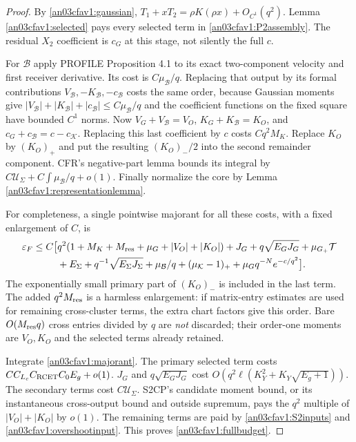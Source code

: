 \documentclass[11pt]{article}
\theoremstyle{remark}\newtheorem{remark}[theorem]{Remark}
\newcommand{\KK}{\mathcal K}
\newcommand{\BB}{\mathcal B}
\newcommand{\Gp}{G_+}
\newcommand{\eps}{\varepsilon}
\begin{document}
\begin{proof}
By \eqref{an03cfav1:gaussian},
$T_1+xT_2=\rho K(\rho x)+O_{C^1}(q^2)$.
Lemma \ref{an03cfav1:selected} pays every selected term
in \eqref{an03cfav1:P2assembly}.
The residual $X_2$ coefficient is $c_G$ at this stage,
not silently the full $c$.

For $\BB$ apply PROFILE Proposition 4.1 to its exact
two-component velocity and first receiver derivative.
Its cost is $C\mu_{\BB}/q$. Replacing that output by its
formal contributions $V_{\BB},-K_{\BB},-c_{\BB}$ costs
the same order, because Gaussian moments give
$|V_{\BB}|+|K_{\BB}|+|c_{\BB}|\le C\mu_{\BB}/q$
and the coefficient functions on the fixed square have
bounded $C^1$ norms. Now $V_G+V_{\BB}=V_O$,
$K_G+K_{\BB}=K_O$, and
$c_G+c_{\BB}=c-c_{\KK}$. Replacing this last coefficient
by $c$ costs $Cq^2M_K$. Replace $K_O$ by $(K_O)_+$ and
put the resulting $(K_O)_-/2$ into the second remainder
component. CFR's negative-part lemma bounds its integral
by $C\mathcal U_\Sigma+C\int\mu_{\BB}/q+o(1)$.
Finally normalize the core by Lemma
\ref{an03cfav1:representationlemma}.

For completeness, a single pointwise majorant for all these
costs, with a fixed enlargement of $C$, is
\begin{align}
 \eps_F\le C\big[&
 q^2(1+M_K+M_{\rm res}+\mu_G+|V_O|+|K_O|)
 +J_G+q\sqrt{E_GJ_G}
 +\mu_{\Gp}\mathcal T\nonumber\\
 &+E_\Sigma+q^{-1}\sqrt{E_\Sigma J_\Sigma}
 +\mu_{\BB}/q+(\mu_{\KK}-1)_+
 +\mu_G q^{-N}e^{-c/q^2}\big].
 \label{an03cfav1:majorant}
\end{align}
The exponentially small primary part of $(K_O)_-$ is
included in the last term. The added $q^2M_{\rm res}$ is
a harmless enlargement: if matrix-entry estimates are used
for remaining cross-cluster terms, the extra chart factors
give this order. Bare $O(M_{\rm res}q)$ cross entries divided
by $q$ are \emph{not} discarded; their order-one moments
are $V_O,K_O$ and the selected terms already retained.

Integrate \eqref{an03cfav1:majorant}.
The primary selected term costs
$C C_{L_c}C_{\rm RCET}C_0E_g+o(1)$.
$J_G$ and $q\sqrt{E_GJ_G}$ cost
$O(q^2\ell(K_Y^2+K_Y\sqrt{E_g+1}))$.
The secondary terms cost $C\mathcal U_\Sigma$.
S2CP's candidate moment bound, or its instantaneous
cross-output bound and outside supremum, pays the $q^2$
multiple of $|V_O|+|K_O|$ by $o(1)$.
The remaining terms are paid by
\eqref{an03cfav1:S2inputs} and
\eqref{an03cfav1:overshootinput}. This proves
\eqref{an03cfav1:fullbudget}.
\end{proof}
\end{document}
